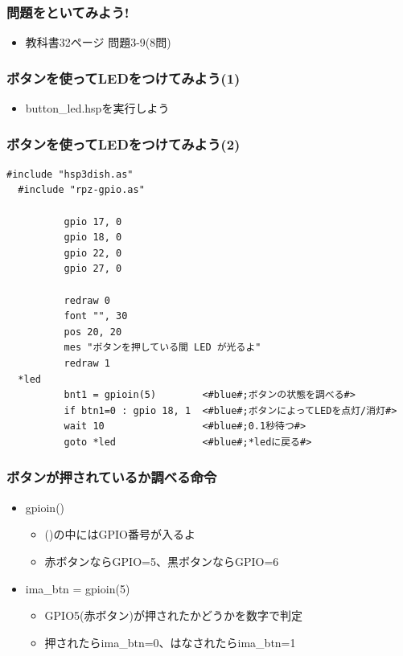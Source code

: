 \begin{frame}
  \frametitle{問題をといてみよう!}
  \begin{itemize}
    \item 教科書32ページ 問題3-9(8問)
  \end{itemize}
\end{frame}

\begin{frame}
  \frametitle{ボタンを使ってLEDをつけてみよう(1)}
    \begin{itemize}
    \item button\_led.hspを実行しよう
  \end{itemize}
\end{frame}

\begin{frame}[fragile]
  \frametitle{ボタンを使ってLEDをつけてみよう(2)}
  \begin{lstlisting}[title=button\_led.hsp, label=button_led.hsp]
  #include "hsp3dish.as"
  #include "rpz-gpio.as"
  
          gpio 17, 0
          gpio 18, 0
          gpio 22, 0
          gpio 27, 0

          redraw 0
          font "", 30
          pos 20, 20
          mes "ボタンを押している間 LED が光るよ"
          redraw 1
  *led
          bnt1 = gpioin(5)        <#blue#;ボタンの状態を調べる#>
          if btn1=0 : gpio 18, 1  <#blue#;ボタンによってLEDを点灯/消灯#>
          wait 10                 <#blue#;0.1秒待つ#>
          goto *led               <#blue#;*ledに戻る#>
  \end{lstlisting}
\end{frame}

\begin{frame}
  \frametitle{ボタンが押されているか調べる命令}
  \begin{itemize}
    \item gpioin()
          \begin{itemize}
            \item ()の中にはGPIO番号が入るよ
            \item 赤ボタンならGPIO=5、黒ボタンならGPIO=6
          \end{itemize}
    \item ima\_btn = gpioin(5)
          \begin{itemize}
            \item GPIO5(赤ボタン)が押されたかどうかを数字で判定
            \item 押されたらima\_btn=0、はなされたらima\_btn=1
          \end{itemize}
  \end{itemize}
\end{frame}

